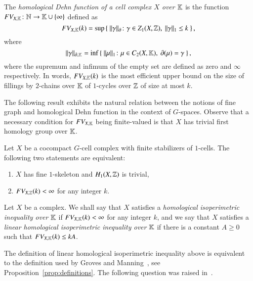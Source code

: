\begin{definition}\label{def:FVX}   The \emph{homological Dehn function of a cell complex $X$ over $\mathbb{K}$} is the function $FV_{X, \mathbb{K}} \colon\mathbb{N} \to \mathbb{K} \cup \{\infty\}$ defined as 
\[FV_{X, \K} (k) = \sup \left \{ \ \| \gamma   \|_{\partial}  \colon \gamma \in Z_1(X, \Z), \ \| \gamma \|_1 \leq k \ \right \},\]
where 
\[ \| \gamma  \|_{\partial, \mathbb{K}}  = \inf \left \{ \ \| \mu \|_1 \colon \mu \in C_{2}(X, \mathbb{K}), \ \partial ( \mu ) = \gamma \ \right \},\]
where the supremum and infimum of the empty set are defined as zero and $\infty$ respectively. In words,  $FV_{X, \mathbb{K}}(k)$ is the most efficient upper bound on the size of fillings by $2$-chains over $\mathbb{K}$ of $1$-cycles over $\mathbb{Z}$ of size at most $k$.
\end{definition}

 The following result  exhibits the natural relation between the notions of fine graph and homological Dehn function in the context of $G$-spaces.  Observe that a necessary condition for $FV_{X, \mathbb{K}}$ being finite-valued  is that   $X$ has  trivial first homology group over $\mathbb{K}$.  

\begin{theorem}\label{prop:main}
Let $X$ be a cocompact $G$-cell complex with finite stabilizers of $1$-cells.  The following two statements are equivalent:
\begin{enumerate}
\item  $X$ has fine $1$-skeleton and $H_1(X, \mathbb{Z})$ is trivial,
\item \label{main2} $FV_{X, \mathbb{Z}}(k)<\infty$ for any integer $k$. 
\end{enumerate}
\end{theorem}

\begin{definition}\label{def:hom-isop-ineq}
Let $X$ be a  complex. We  shall say that $X$ satisfies a \emph{homological isoperimetric inequality over $\mathbb{K}$} if  $FV_{X, \mathbb{K}}(k)<\infty$ for any integer $k$, and we say that $X$ satisfies a \emph{linear homological isoperimetric inequality over $\mathbb{K}$} if  there is a constant $A\geq 0$ such that $FV_{X, \mathbb{K}}(k)\leq kA$.
\end{definition}

The definition of linear homological isoperimetric inequality  above is equivalent to the definition used by Groves and Manning~\cite[Definition 2.28]{GrMa09}, see Proposition~\ref{prop:definitions}. The following question was raised in~\cite{GrMa09}.

